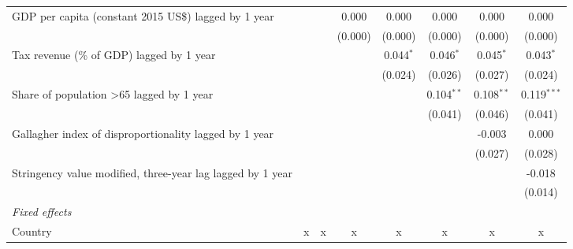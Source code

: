 \begin{tabular}{lccccccc}
   GDP per capita (constant 2015 US\$) lagged by 1 year                                          &                &               & 0.000         & 0.000         & 0.000          & 0.000          & 0.000\\   
                                                                                                 &                &               & (0.000)       & (0.000)       & (0.000)        & (0.000)        & (0.000)\\   
   Tax revenue (\% of GDP) lagged by 1 year                                                      &                &               &               & 0.044$^{*}$   & 0.046$^{*}$    & 0.045$^{*}$    & 0.043$^{*}$\\   
                                                                                                 &                &               &               & (0.024)       & (0.026)        & (0.027)        & (0.024)\\   
   Share of population >65 lagged by 1 year                                                      &                &               &               &               & 0.104$^{**}$   & 0.108$^{**}$   & 0.119$^{***}$\\   
                                                                                                 &                &               &               &               & (0.041)        & (0.046)        & (0.041)\\   
   Gallagher index of disproportionality lagged by 1 year                                        &                &               &               &               &                & -0.003         & 0.000\\   
                                                                                                 &                &               &               &               &                & (0.027)        & (0.028)\\   
   Stringency value modified, three-year lag lagged by 1 year                                    &                &               &               &               &                &                & -0.018\\   
                                                                                                 &                &               &               &               &                &                & (0.014)\\   
   \emph{Fixed effects}\\
   Country                                                                                       & x              & x             & x             & x             & x              & x              & x\\  

\end{tabular}
